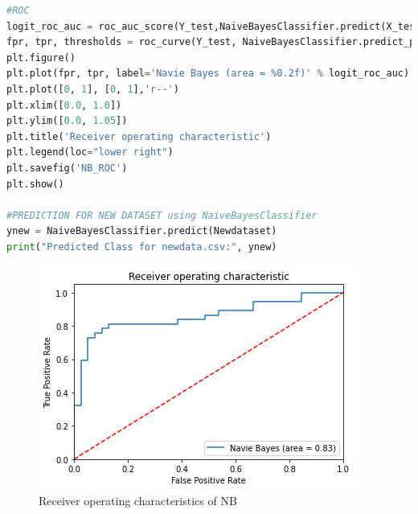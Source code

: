 \begin{lstlisting}[language=Python, label=list:python_code_ex]
#ROC
logit_roc_auc = roc_auc_score(Y_test,NaiveBayesClassifier.predict(X_test))
fpr, tpr, thresholds = roc_curve(Y_test, NaiveBayesClassifier.predict_proba(X_test)[:,1])
plt.figure()
plt.plot(fpr, tpr, label='Navie Bayes (area = %0.2f)' % logit_roc_auc)
plt.plot([0, 1], [0, 1],'r--')
plt.xlim([0.0, 1.0])
plt.ylim([0.0, 1.05])
plt.title('Receiver operating characteristic')
plt.legend(loc="lower right")
plt.savefig('NB_ROC')
plt.show()

#PREDICTION FOR NEW DATASET using NaiveBayesClassifier
ynew = NaiveBayesClassifier.predict(Newdataset)
print("Predicted Class for newdata.csv:", ynew)
\end{lstlisting}

\begin{figure}[H]
    \centering
    \includegraphics[width=0.4\linewidth]{NB.png}
    \caption{Receiver operating characteristics of NB}
    \label{NB}
\end{figure}